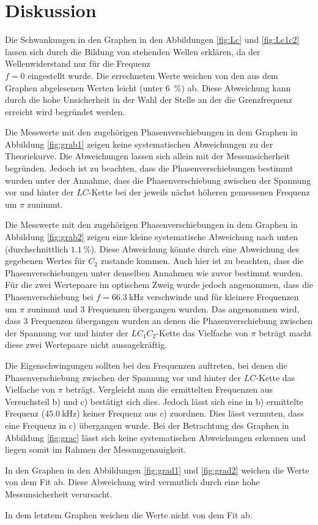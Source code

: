 
\section{Diskussion}
\label{sec:Diskussion}

Die Schwankungen in den Graphen in den Abbildungen \ref{fig:Lc} und \ref{fig:Lc1c2}
 lassen sich durch die Bildung von stehenden Wellen erklären, da der Wellenwiderstand
  nur für die Frequenz \\$f=0$ eingestellt wurde. Die errechneten Werte weichen
	 von den aus dem Graphen abgelesenen Werten leicht (unter \SI{6}{\percent}) ab.
	  Diese Abweichung kann durch die hohe Unsicherheit in der Wahl der Stelle an
		 der die Grenzfrequenz erreicht wird begründet werden.

Die Messwerte mit den zugehörigen Phasenverschiebungen in dem Graphen in Abbildung
 \ref{fig:grab1} zeigen keine systematischen Abweichungen zu der Theoriekurve.
  Die Abweichungen lassen sich allein mit der Messunsicherheit begründen.
	 Jedoch ist zu beachten, dass die Phasenverschiebungen bestimmt wurden unter
	  der Annahme, dass die Phasenverschiebung zwischen der Spannung vor und hinter
		 der $LC$-Kette bei der jeweils nächst höheren gemessenen Frequenz um $\pi$ zunimmt.

Die Messwerte mit den zugehörigen Phasenverschiebungen in dem Graphen in Abbildung
 \ref{fig:grab2} zeigen eine kleine systematische Abweichung nach unten
  (durchschnittlich $\SI{1.1}{\percent}$). Diese Abweichung könnte durch eine
	 Abweichung des gegebenen Wertes für $C_2$ zustande kommen. Auch hier ist zu
	  beachten, dass die Phasenverschiebungen unter denselben Annahmen wie zuvor
		 bestimmt wurden. Für die zwei Wertepaare im optischem Zweig wurde jedoch
		  angenommen, dass die Phasenverschiebung bei $f=\SI{66.3}{\kilo\hertz}$
			 verschwinde und für kleinere Frequenzen um $\pi$ zunimmt und 3 Frequenzen
			  übergangen wurden. Das angenommen wird, dass 3 Frequenzen übergangen
				 wurden an denen die Phasenverschiebung zwischen der Spannung vor und
				  hinter der $LC_1C_2$-Kette das Vielfache von $\pi$ beträgt macht
					 diese zwei Wertepaare nicht aussagekräftig.

Die Eigenschwingungen sollten bei den Frequenzen auftreten, bei denen die
 Phasenverschiebung zwischen der Spannung vor und hinter der $LC$-Kette das
  Vielfache von $\pi$ beträgt. Vergleicht man die ermittelten Frequenzen aus
	 Versuchsteil b) und c) bestätigt sich dies. Jedoch lässt sich eine in b)
	  ermittelte Frequenz ($\SI{45.0}{\kilo\hertz}$) keiner Frequenz aus c) zuordnen.
		 Dies lässt vermuten, dass eine Frequenz in c) übergangen wurde.
Bei der Betrachtung des Graphen in Abbildung \ref{fig:grac} lässt sich keine
 systematischen Abweichungen erkennen und liegen somit im Rahmen der Messungenauigkeit.

In den Graphen in den Abbildungen \ref{fig:grad1} und \ref{fig:grad2} weichen die Werte von dem Fit ab. Diese Abweichung wird vermutlich durch eine hohe Messunsicherheit verursacht.

In dem letztem Graphen weichen die Werte nicht von dem Fit ab.

